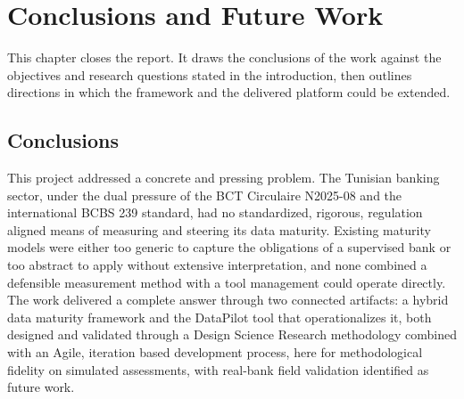 
\section{Conclusions and Future Work}

This chapter closes the report. It draws the conclusions of the work against the objectives and research questions stated in the introduction, then outlines directions in which the framework and the delivered platform could be extended.

\subsection{Conclusions}

This project addressed a concrete and pressing problem. The Tunisian banking sector, under the dual pressure of the BCT Circulaire N\textdegree{}2025-08 and the international BCBS 239 standard, had no standardized, rigorous, regulation aligned means of measuring and steering its data maturity. Existing maturity models were either too generic to capture the obligations of a supervised bank or too abstract to apply without extensive interpretation, and none combined a defensible measurement method with a tool management could operate directly. The work delivered a complete answer through two connected artifacts: a hybrid data maturity framework and the DataPilot tool that operationalizes it, both designed and validated through a Design Science Research methodology combined with an Agile, iteration based development process, here for methodological fidelity on simulated assessments, with real-bank field validation identified as future work.

